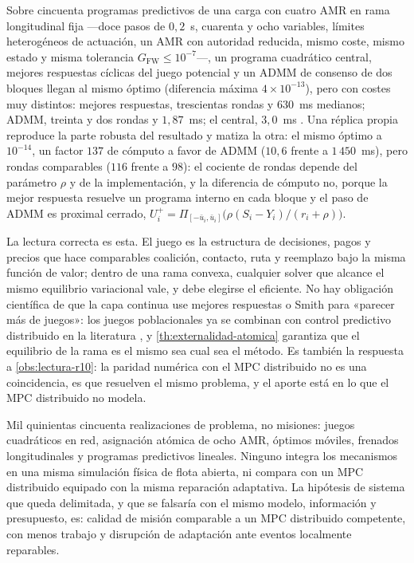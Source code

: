 \begin{observacion}
\label{obs:solver-en-rama}
Sobre cincuenta programas predictivos de una carga con cuatro AMR en rama
longitudinal fija —doce pasos de $0{,}2$~s, cuarenta y ocho variables, límites
heterogéneos de actuación, un AMR con autoridad reducida, mismo coste, mismo
estado y misma tolerancia $G_{\mathrm{FW}}\le10^{-7}$—, un programa cuadrático
central, mejores respuestas cíclicas del juego potencial y un ADMM de consenso
de dos bloques \cite{boyd2011admm} llegan al mismo óptimo (diferencia máxima
$4\times10^{-13}$), pero con costes muy distintos: mejores respuestas,
trescientas rondas y $630$~ms medianos; ADMM, treinta y dos rondas y
$1{,}87$~ms; el central, $3{,}0$~ms \cite{mrob2026r11}. Una réplica propia
reproduce la parte robusta del resultado y matiza la otra: el mismo óptimo a
$10^{-14}$, un factor $137$ de cómputo a favor de ADMM ($10{,}6$ frente a
$1\,450$~ms), pero rondas comparables ($116$ frente a $98$): el cociente de
rondas depende del parámetro $\rho$ y de la implementación, y la diferencia de
cómputo no, porque la mejor respuesta resuelve un programa interno en cada
bloque y el paso de ADMM es proximal cerrado,
$U_i^{+}=\Pi_{[-\bar u_i,\bar u_i]}\bigl(\rho(S_i-Y_i)/(r_i+\rho)\bigr)$.

La lectura correcta es esta. El juego es la estructura de decisiones, pagos y
precios que hace comparables coalición, contacto, ruta y reemplazo bajo la
misma función de valor; dentro de una rama convexa, cualquier solver que
alcance el mismo equilibrio variacional vale, y debe elegirse el eficiente.
No hay obligación científica de que la capa continua use mejores respuestas o
Smith para «parecer más de juegos»: los juegos poblacionales ya se combinan con
control predictivo distribuido en la literatura \cite{barreiro2019evolutionary},
y \cref{th:externalidad-atomica} garantiza que el equilibrio de la rama es el
mismo sea cual sea el método. Es también la respuesta a
\cref{obs:lectura-r10}: la paridad numérica con el MPC distribuido no es una
coincidencia, es que resuelven el mismo problema, y el aporte está en lo que
el MPC distribuido no modela.
\end{observacion}

\begin{observacion}
\label{obs:r11-alcance}
Mil quinientas cincuenta realizaciones de problema, no misiones: juegos
cuadráticos en red, asignación atómica de ocho AMR, óptimos móviles, frenados
longitudinales y programas predictivos lineales. Ninguno integra los
mecanismos en una misma simulación física de flota abierta, ni compara con
un MPC distribuido equipado con la misma reparación adaptativa. La hipótesis
de sistema que queda delimitada, y que se falsaría con el mismo modelo,
información y presupuesto, es: calidad de misión comparable a un MPC
distribuido competente, con menos trabajo y disrupción de adaptación ante
eventos localmente reparables.
\end{observacion}

